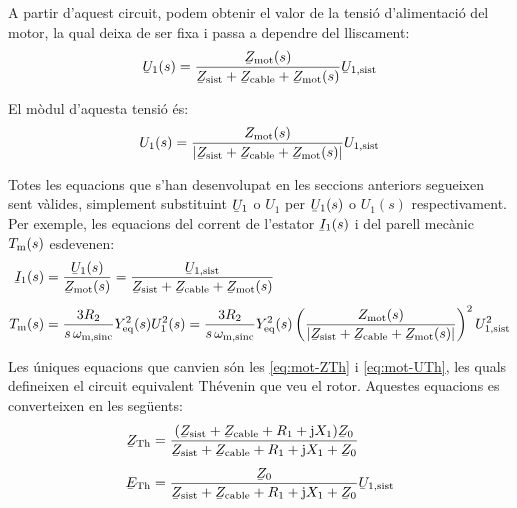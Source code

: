 A partir d'aquest circuit, podem obtenir  el valor de la tensió d'alimentació del motor, la qual deixa de ser fixa i passa a dependre del  lliscament:
\begin{equation}
	\cmplx{U}_1(s) = \frac{\cmplx{Z}\ped{mot}(s)}{\cmplx{Z}\ped{sist} + \cmplx{Z}\ped{cable} +  \cmplx{Z}\ped{mot}(s)} \cmplx{U}\ped{1,sist}\label{eq:mot-U-redu}
\end{equation}

El mòdul d'aquesta tensió és:
\begin{equation}
	U_1(s) = \frac{Z\ped{mot}(s)}{|\cmplx{Z}\ped{sist} + \cmplx{Z}\ped{cable} +  \cmplx{Z}\ped{mot}(s)|} U\ped{1,sist}
\end{equation}

Totes les equacions que s'han desenvolupat en les seccions anteriors segueixen sent vàlides, simplement substituint $\cmplx{U}_1$ o $U_1$ per  $\cmplx{U}_1(s)$ o $U_1(s)$ respectivament. Per exemple, les equacions del corrent de l'estator $\cmplx{I}_1(s)$ i del parell mecànic $T_\mathrm{m}(s)$ esdevenen:
\begin{subequations}
	\begin{align}
	\cmplx{I}_1(s) &= \frac{\cmplx{U}_1(s)}{\cmplx{Z}\ped{mot}(s)} = \frac{\cmplx{U}\ped{1,sist}}{\cmplx{Z}\ped{sist} + \cmplx{Z}\ped{cable} +  \cmplx{Z}\ped{mot}(s)} \label{eq:mot-I-redu} \\[1ex]
	T\ped{m}(s)  &= \frac{3 R_2}{s\,\omega\ped{m,sinc}} Y\ped{eq}^2(s) U_1^2(s) =
	\frac{3 R_2}{s\,\omega\ped{m,sinc}} Y\ped{eq}^2(s) \left(\frac{Z\ped{mot}(s)}{|\cmplx{Z}\ped{sist} + \cmplx{Z}\ped{cable} +  \cmplx{Z}\ped{mot}(s)|} \right)^2 U\ped{1,sist}^2 \label{eq:mot-Tm-redu}
	\end{align}
\end{subequations}

Les úniques equacions que canvien són les \eqref{eq:mot-ZTh} i  \eqref{eq:mot-UTh}, les quals defineixen el circuit  equivalent Thévenin que veu el rotor. Aquestes equacions es converteixen en les següents:
\begin{subequations}
	\begin{align}
	\cmplx{Z}\ped{Th} &= \frac{(\cmplx{Z}\ped{sist} + \cmplx{Z}\ped{cable} + R_1 + \ju X_1) \cmplx{Z}_0}{\cmplx{Z}\ped{sist} + \cmplx{Z}\ped{cable} + R_1 + \ju X_1 + \cmplx{Z}_0} \label{eq:mot-ZTh-redu}\\[1ex]
	\cmplx{E}\ped{Th} &= \frac{\cmplx{Z}_0}{\cmplx{Z}\ped{sist} + \cmplx{Z}\ped{cable} + R_1 + \ju X_1 + \cmplx{Z}_0} \cmplx{U}\ped{1,sist} \label{eq:mot-UTh-redu}
	\end{align}
\end{subequations}


